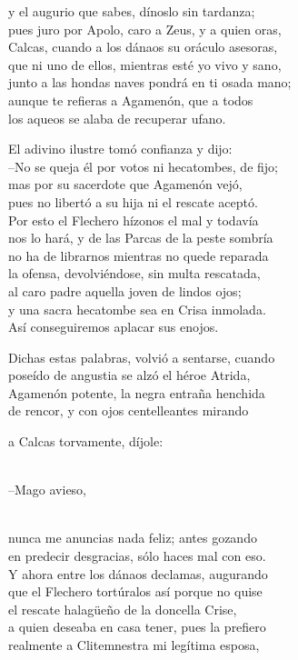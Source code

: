 \documentclass[11pt,twoside]{article}
\newcommand{\dlgo}[2]{\sbox{\dbox}{#1}\parbox[t]{\linewidth}{#1\strut\\[0pt]\hspace*{\wd\dbox}\hspace{\fontdimen2\font}#2\strut}}
\begin{document}
y el augurio que sabes, dínoslo sin tardanza;\\
pues juro por Apolo, caro a Zeus, y a quien oras,\\
Calcas, cuando a los dánaos su oráculo asesoras,\\
que ni uno de ellos, mientras esté yo vivo y sano,\\
junto a las hondas naves pondrá en ti osada mano;\\
aunque te refieras a Agamenón, que a todos\\
los aqueos se alaba de recuperar ufano.\par
El adivino ilustre tomó confianza y dijo:\\
--No se queja él por votos ni hecatombes, de fijo;\\
mas por su sacerdote que Agamenón vejó,\\
pues no libertó a su hija ni el rescate aceptó.\\
Por esto el Flechero hízonos el mal y todavía\\
nos lo hará, y de las Parcas de la peste sombría\\
no ha de librarnos mientras no quede reparada\\
la ofensa, devolviéndose, sin multa rescatada,\\
al caro padre aquella joven de lindos ojos;\\
y una sacra hecatombe sea en Crisa inmolada.\\
Así conseguiremos aplacar sus enojos.\par
Dichas estas palabras, volvió a sentarse, cuando\\
poseído de angustia se alzó el héroe Atrida,\\
Agamenón potente, la negra entraña henchida\\
de rencor, y con ojos centelleantes mirando\\
\dlgo{a Calcas torvamente, díjole:}{--Mago avieso,}\\
nunca me anuncias nada feliz; antes gozando\\
en predecir desgracias, sólo haces mal con eso.\\
Y ahora entre los dánaos declamas, augurando\\
que el Flechero tortúralos así porque no quise\\
el rescate halagüeño de la doncella Crise,\\
a quien deseaba en casa tener, pues la prefiero\\
realmente a Clitemnestra mi legítima esposa,\\
\end{document}
